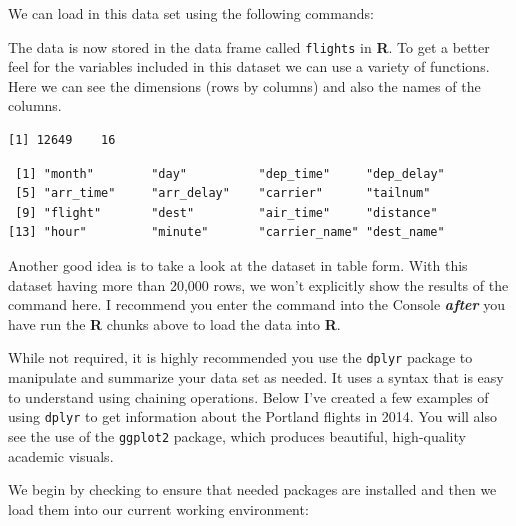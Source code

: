 \documentclass[12pt,twoside]{reedthesis}
\begin{document}
We can load in this data set using the following commands:

The data is now stored in the data frame called \texttt{flights} in \textbf{R}. To get a better feel for the variables included in this dataset we can use a variety of functions. Here we can see the dimensions (rows by columns) and also the names of the columns.
\begin{verbatim}
[1] 12649    16
\end{verbatim}
\begin{verbatim}
 [1] "month"        "day"          "dep_time"     "dep_delay"   
 [5] "arr_time"     "arr_delay"    "carrier"      "tailnum"     
 [9] "flight"       "dest"         "air_time"     "distance"    
[13] "hour"         "minute"       "carrier_name" "dest_name"   
\end{verbatim}
Another good idea is to take a look at the dataset in table form. With this dataset having more than 20,000 rows, we won't explicitly show the results of the command here. I recommend you enter the command into the Console \textbf{\emph{after}} you have run the \textbf{R} chunks above to load the data into \textbf{R}.

While not required, it is highly recommended you use the \texttt{dplyr} package to manipulate and summarize your data set as needed. It uses a syntax that is easy to understand using chaining operations. Below I've created a few examples of using \texttt{dplyr} to get information about the Portland flights in 2014. You will also see the use of the \texttt{ggplot2} package, which produces beautiful, high-quality academic visuals.

We begin by checking to ensure that needed packages are installed and then we load them into our current working environment:

\clearpage
\end{document}
